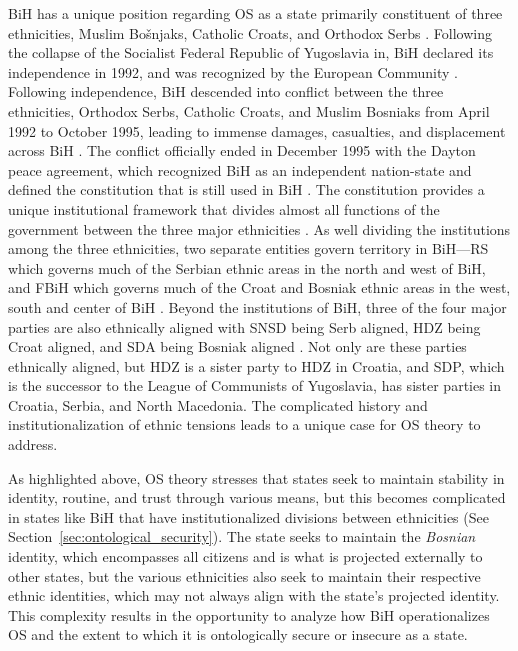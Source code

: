 \ac{BiH} has a unique position regarding \ac{OS} as a state primarily constituent of three ethnicities, Muslim Bo\v{s}njaks, Catholic Croats, and Orthodox Serbs \citep[pg.~85]{Bringa_2000}. Following the collapse of the Socialist Federal Republic of Yugoslavia in, \ac{BiH} declared its independence in 1992, and was recognized by the European Community \citep[pg.~216]{davidPolicingMemoryBosnia2019}. Following independence, \ac{BiH} descended into conflict between the three ethnicities, Orthodox Serbs, Catholic Croats, and Muslim Bosniaks from April 1992 to October 1995, leading to immense damages, casualties, and displacement across \ac{BiH} \citep[pg.~216]{davidPolicingMemoryBosnia2019}. The conflict officially ended in December 1995 with the Dayton peace agreement, which recognized \ac{BiH} as an independent nation-state and defined the constitution that is still used in \ac{BiH} \citep[pg.~216]{davidPolicingMemoryBosnia2019}. The constitution provides a unique institutional framework that divides almost all functions of the government between the three major ethnicities \citep{oscemissiontobosniaandherzegovina1995}. As well dividing the institutions among the three ethnicities, two separate entities govern territory in \ac{BiH}---\ac{RS} which governs much of the Serbian ethnic areas in the north and west of \ac{BiH}, and \ac{FBiH} which governs much of the Croat and Bosniak ethnic areas in the west, south and center of \ac{BiH} \citep{oscemissiontobosniaandherzegovina1995}. Beyond the institutions of \ac{BiH}, three of the four major parties are also ethnically aligned with \ac{SNSD} being Serb aligned, \ac{HDZ} being Croat aligned, and \ac{SDA} being Bosniak aligned \citep{Parlamentarna_2026}. Not only are these parties ethnically aligned, but \ac{HDZ} is a sister party to HDZ in Croatia, and \ac{SDP}, which is the successor to the League of Communists of Yugoslavia, has sister parties in Croatia, Serbia, and North Macedonia. The complicated history and institutionalization of ethnic tensions leads to a unique case for \ac{OS} theory to address.

As highlighted above, \ac{OS} theory stresses that states seek to maintain stability in identity, routine, and trust through various means, but this becomes complicated in states like \ac{BiH} that have institutionalized divisions between ethnicities (See Section~\hyperref[sec:ontological_security]{\ref*{sec:ontological_security}}). The state seeks to maintain the \textit{Bosnian} identity, which encompasses all citizens and is what is projected externally to other states, but the various ethnicities also seek to maintain their respective ethnic identities, which may not always align with the state's projected identity. This complexity results in the opportunity to analyze how \ac{BiH} operationalizes \ac{OS} and the extent to which it is ontologically secure or insecure as a state. 

